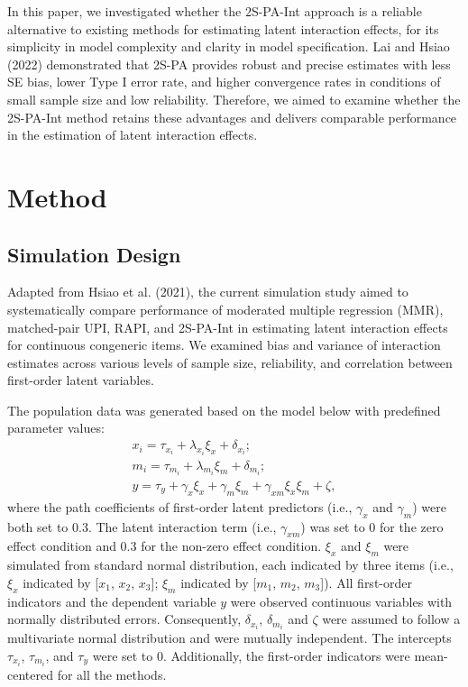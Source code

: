 \documentclass[
  man]{apa6}
\begin{document}
In this paper, we investigated whether the 2S-PA-Int approach is a reliable alternative to existing methods for estimating latent interaction effects, for its simplicity in model complexity and clarity in model specification. Lai and Hsiao (2022) demonstrated that 2S-PA provides robust and precise estimates with less SE bias, lower Type I error rate, and higher convergence rates in conditions of small sample size and low reliability. Therefore, we aimed to examine whether the 2S-PA-Int method retains these advantages and delivers comparable performance in the estimation of latent interaction effects.

\section{Method}\label{method}

\subsection{Simulation Design}\label{simulation-design}

Adapted from Hsiao et al. (2021), the current simulation study aimed to systematically compare performance of moderated multiple regression (MMR), matched-pair UPI, RAPI, and 2S-PA-Int in estimating latent interaction effects for continuous congeneric items. We examined bias and variance of interaction estimates across various levels of sample size, reliability, and correlation between first-order latent variables.

The population data was generated based on the model below with predefined parameter values:
\begin{equation}
\begin{gathered}
x_{i} =  \tau_{x_{i}} + \lambda_{x_{i}}\xi_{x} + \delta_{x_{i}};\\
m_{i} =  \tau_{m_{i}} + \lambda_{m_{i}}\xi_{m} + \delta_{m_{i}};\\
y =  \tau_{y} + \gamma_{x}\xi_{x} + \gamma_{m}\xi_{m} + \gamma_{xm}\xi_{x}\xi_{m} + \zeta,
\end{gathered}
\end{equation}
where the path coefficients of first-order latent predictors (i.e., \(\gamma_{x}\) and \(\gamma_{m}\)) were both set to 0.3. The latent interaction term (i.e., \(\gamma_{xm}\)) was set to 0 for the zero effect condition and 0.3 for the non-zero effect condition. \(\xi_{x}\) and \(\xi_{m}\) were simulated from standard normal distribution, each indicated by three items (i.e., \(\xi_{x}\) indicated by {[}\(x_{1}\), \(x_{2}\), \(x_{3}\){]}; \(\xi_{m}\) indicated by {[}\(m_{1}\), \(m_{2}\), \(m_{3}\){]}). All first-order indicators and the dependent variable \(y\) were observed continuous variables with normally distributed errors. Consequently, \(\delta_{x_{i}}\), \(\delta_{m_{i}}\) and \(\zeta\) were assumed to follow a multivariate normal distribution and were mutually independent. The intercepts \(\tau_{x_{i}}\), \(\tau_{m_{i}}\), and \(\tau_{y}\) were set to 0. Additionally, the first-order indicators were mean-centered for all the methods.
\end{document}
